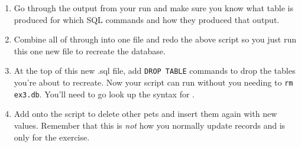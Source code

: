 \begin{enumerate}
\item Go through the output from your run and make sure you know what table
    is produced for which SQL commands and how they produced that output.
\item Combine all of  through  into one file and
    redo the above script so you just run this one new file to recreate
    the database.
\item At the top of this new .sql file, add \verb|DROP TABLE| commands to
    drop the tables you're about to recreate. Now your script can run without
    you needing to \verb|rm ex3.db|.  You'll need to go look up the syntax
    for .
\item Add onto the script to delete other pets and insert them again with
    new values.  Remember that this is \emph{not} how you normally update
    records and is only for the exercise.
\end{enumerate}

